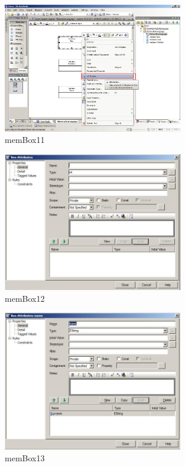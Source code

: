 \begin{figure}[htbp]
	\centering
  \includegraphics[width=0.7\textwidth]{pics/memBox11.png}
	\caption{memBox11}
	\label{memBox11}
\end{figure}

\begin{figure}[htbp]
	\centering
  \includegraphics[width=0.7\textwidth]{pics/memBox12.png}
	\caption{memBox12}
	\label{memBox12}
\end{figure}

\begin{figure}[htbp]
	\centering
  \includegraphics[width=0.7\textwidth]{pics/memBox13.png}
	\caption{memBox13}
	\label{memBox13}
\end{figure}

